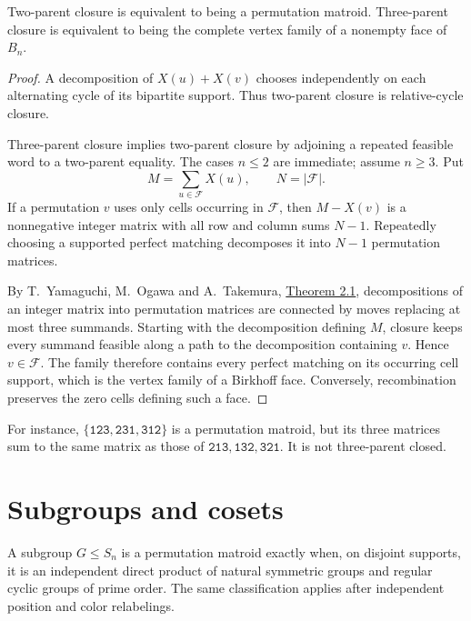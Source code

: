 \begin{theorem}
Two-parent closure is equivalent to being a permutation matroid.
Three-parent closure is equivalent to being the complete vertex family
of a nonempty face of $B_n$.
\end{theorem}

\begin{proof}
A decomposition of $X(u)+X(v)$ chooses independently on each alternating
cycle of its bipartite support. Thus two-parent closure is relative-cycle
closure.

Three-parent closure implies two-parent closure by adjoining a repeated
feasible word to a two-parent equality. The cases $n\leq2$ are immediate;
assume $n\geq3$. Put
\[
 M=\sum_{u\in\mathcal F}X(u),\qquad N=|\mathcal F|.
\]
If a permutation $v$ uses only cells occurring in $\mathcal F$, then
$M-X(v)$ is a nonnegative integer matrix with all row and column sums
$N-1$. Repeatedly choosing a supported perfect matching decomposes it
into $N-1$ permutation matrices.

By T.~Yamaguchi, M.~Ogawa and A.~Takemura,
\href{https://arxiv.org/abs/1304.1237}{Theorem 2.1},
decompositions of an integer matrix into permutation matrices are
connected by moves replacing at most three summands. Starting with the
decomposition defining $M$, closure keeps every summand feasible along
a path to the decomposition containing $v$. Hence $v\in\mathcal F$.
The family therefore contains every perfect matching on its occurring
cell support, which is the vertex family of a Birkhoff face.
Conversely, recombination preserves the zero cells defining such a face.
\end{proof}

For instance, $\{\mathtt{123},\mathtt{231},\mathtt{312}\}$ is a
permutation matroid, but its three matrices sum to the same matrix as
those of $\mathtt{213},\mathtt{132},\mathtt{321}$.
It is not three-parent closed.

\section[permutationGroups]{Subgroups and cosets}

\begin{theorem}
A subgroup $G\leq S_n$ is a permutation matroid exactly when, on
disjoint supports, it is an independent direct product of natural
symmetric groups and regular cyclic groups of prime order.
The same classification applies after independent position and color
relabelings.
\end{theorem}

